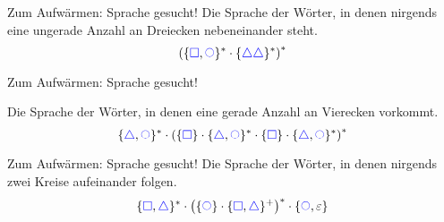 \begin{frame}{Zum Aufwärmen: Sprache gesucht!}
	Die Sprache der Wörter, in denen nirgends eine ungerade Anzahl an Dreiecken nebeneinander steht.
	\bigskip
	\pause
	$$ \left(\{\mword \square, \mword \mycircle\}^* \cdot \{\mword \triangle\mword \triangle\}^* \right)^* $$
\end{frame}

\begin{frame}{Zum Aufwärmen: Sprache gesucht!}
	
	
	Die Sprache der Wörter, in denen eine gerade Anzahl an Vierecken vorkommt.
	\bigskip
	\pause
	$$ \{\mword \triangle, \mword \mycircle\}^* \cdot \left( \{\mword \square\} \cdot \{\mword \triangle, \mword \mycircle\}^* \cdot \{\mword \square\} \cdot \{\mword \triangle, \mword \mycircle\}^* \right)^* $$
	

\end{frame}

\begin{frame}{Zum Aufwärmen: Sprache gesucht!}
	Die Sprache der Wörter, in denen nirgends zwei Kreise aufeinander folgen.
	\bigskip
	\pause
	$$ \{\mword \square, \mword \triangle\}^* \cdot \left( \{\mword \mycircle\} \cdot \{\mword \square, \mword \triangle\}^+ \right)^* \cdot \{\mword \mycircle, \varepsilon\} $$
	

	
\end{frame}